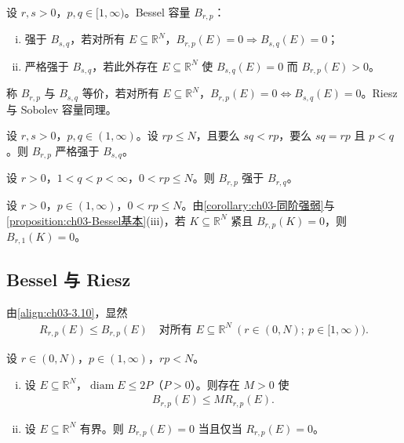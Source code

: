 \documentclass[../../main.tex]{subfiles}%
\begin{document}
\begin{definition}\label{definition:ch03-容量强弱}
设 $r,s>0$，$p,q\in[1,\infty)$。Bessel 容量 $B_{r,p}$：
\begin{enumerate}[(i)]
\item 强于 $B_{s,q}$，若对所有 $E\subseteq\mathbb{R}^N$，$B_{r,p}(E)=0\Rightarrow B_{s,q}(E)=0$；
\item 严格强于 $B_{s,q}$，若此外存在 $E\subseteq\mathbb{R}^N$ 使 $B_{s,q}(E)=0$ 而 $B_{r,p}(E)>0$。
\end{enumerate}
称 $B_{r,p}$ 与 $B_{s,q}$ 等价，若对所有 $E\subseteq\mathbb{R}^N$，$B_{r,p}(E)=0\Leftrightarrow B_{s,q}(E)=0$。Riesz 与 Sobolev 容量同理。
\end{definition}

\begin{theorem}\label{theorem:ch03-严格强弱}
设 $r,s>0$，$p,q\in(1,\infty)$。设 $rp\leqslant N$，且要么 $sq<rp$，要么 $sq=rp$ 且 $p<q$。则 $B_{r,p}$ 严格强于 $B_{s,q}$。
\end{theorem}

\begin{corollary}\label{corollary:ch03-同阶强弱}
设 $r>0$，$1<q<p<\infty$，$0<rp\leqslant N$。则 $B_{r,p}$ 强于 $B_{r,q}$。
\end{corollary}

\begin{remark}\label{remark:ch03-紧零集}
设 $r>0$，$p\in(1,\infty)$，$0<rp\leqslant N$。由\cref{corollary:ch03-同阶强弱}与\cref{proposition:ch03-Bessel基本}(iii)，若 $K\subseteq\mathbb{R}^N$ 紧且 $B_{r,p}(K)=0$，则 $B_{r,1}(K)=0$。
\end{remark}

\subsection{Bessel 与 Riesz}\label{subsection:ch03-BesselRiesz关系}

由\eqref{align:ch03-3.10}，显然
\begin{align}
R_{r,p}(E)\leqslant B_{r,p}(E)\quad \text{对所有 }E\subseteq\mathbb{R}^N\ (r\in(0,N);\ p\in[1,\infty)).\label{align:ch03-3.70}
\end{align}

\begin{proposition}\label{proposition:ch03-BesselRiesz等价}
设 $r\in(0,N)$，$p\in(1,\infty)$，$rp<N$。
\begin{enumerate}[(i)]
\item 设 $E\subseteq\mathbb{R}^N$，$\operatorname{diam}E\leqslant2P$（$P>0$）。则存在 $M>0$ 使
\begin{align}
B_{r,p}(E)\leqslant MR_{r,p}(E).\label{align:ch03-3.71}
\end{align}
\item 设 $E\subseteq\mathbb{R}^N$ 有界。则 $B_{r,p}(E)=0$ 当且仅当 $R_{r,p}(E)=0$。
\end{enumerate}
\end{proposition}
\end{document}
